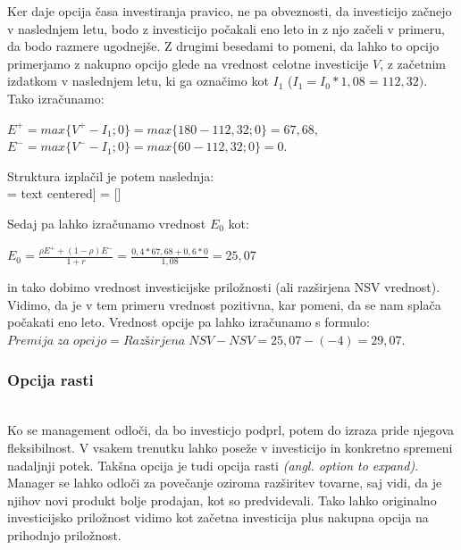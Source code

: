 \documentclass[12pt, a4paper]{amsart}
\theoremstyle{definition} %
\theoremstyle{plain} %
\begin{document}
Ker daje opcija časa investiranja pravico, ne pa obveznosti, da investicijo začnejo v naslednjem letu, bodo z investicijo počakali eno leto in z njo začeli v primeru, da bodo razmere ugodnejše. Z drugimi besedami to pomeni, da lahko to opcijo primerjamo z nakupno opcijo glede na vrednost celotne investicije $V$, z začetnim izdatkom v naslednjem letu, ki ga označimo kot $I_1$ ($I_1 = I_0*1,08 = 112,32)$.  Tako izračunamo:
 \begin{center}
$E^+ = max\{V^+ - I_1; 0\} = max\{180 - 112,32; 0\} = 67,68$,\\[0,5 cm]
$E^- = max\{V^- - I_1; 0\} = max\{60 - 112,32; 0\} = 0.$
\end{center}
Struktura izplačil je potem naslednja: \\

 =  text centered]
 = []


Sedaj pa lahko izračunamo vrednost $E_0$ kot: 
 \begin{center}
$E_0 = \tfrac{\rho E^+ + (1-\rho)E^-}{1+r} = \tfrac{0,4 * 67,68 + 0,6 * 0}{1,08} = 25,07 $
\end{center}
in tako dobimo vrednost investicijske priložnosti (ali razširjena NSV vrednost). Vidimo, da je v tem primeru vrednost pozitivna, kar pomeni, da se nam splača počakati eno leto. Vrednost opcije pa lahko izračunamo s formulo:\\[0,5 cm]
$Premija\;za\; opcijo = Razširjena\; NSV - NSV = 25,07 - (-4) = 29,07. $\\

\subsubsection{Opcija rasti}
\cite[str. 162, 163]{Trigeorgis}\\
Ko se management odloči, da bo investicjo podprl, potem do izraza pride njegova fleksibilnost. V vsakem trenutku lahko poseže v investicijo in konkretno spremeni nadaljnji potek. Takšna opcija je tudi opcija rasti \textit{(angl. option to expand)}. Manager se lahko odloči za povečanje oziroma razširitev tovarne, saj vidi, da je njihov novi produkt bolje prodajan, kot so predvidevali. Tako lahko originalno investicijsko priložnost vidimo kot začetna investicija plus nakupna opcija na prihodnjo priložnost.\\
\end{document}
